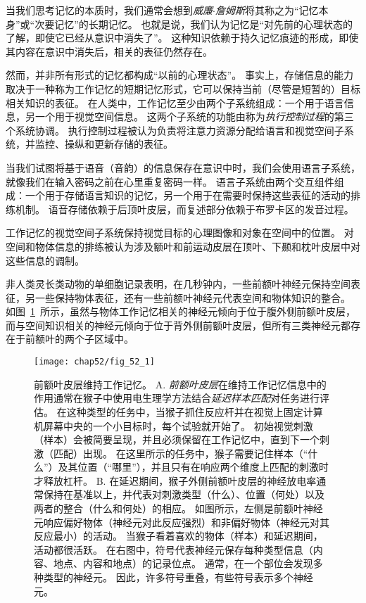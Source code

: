 当我们思考记忆的本质时，我们通常会想到\textit{威廉$\cdot$詹姆斯}将其称之为“记忆本身”或“次要记忆”的长期记忆。
也就是说，我们认为记忆是“对先前的心理状态的了解，即使它已经从意识中消失了”。
这种知识依赖于持久记忆痕迹的形成，即使其内容在意识中消失后，相关的表征仍然存在。


然而，并非所有形式的记忆都构成“以前的心理状态”。
事实上，存储信息的能力取决于一种称为工作记忆的短期记忆形式，它可以保持当前（尽管是短暂的）目标相关知识的表征。
在人类中，工作记忆至少由两个子系统组成：一个用于语言信息，另一个用于视觉空间信息。
这两个子系统的功能由称为\textit{执行控制过程}的第三个系统协调。
执行控制过程被认为负责将注意力资源分配给语言和视觉空间子系统，并监控、操纵和更新存储的表征。


当我们试图将基于语音（音韵）的信息保存在意识中时，我们会使用语言子系统，就像我们在输入密码之前在心里重复密码一样。
语言子系统由两个交互组件组成：一个用于存储语言知识的记忆，另一个用于在需要时保持这些表征的活动的排练机制。
语音存储依赖于后顶叶皮层，而复述部分依赖于布罗卡区的发音过程。


工作记忆的视觉空间子系统保持视觉目标的心理图像和对象在空间中的位置。
对空间和物体信息的排练被认为涉及额叶和前运动皮层在顶叶、下颞和枕叶皮层中对这些信息的调制。


非人类灵长类动物的单细胞记录表明，在几秒钟内，一些前额叶神经元保持空间表征，另一些保持物体表征，还有一些前额叶神经元代表空间和物体知识的整合。
如图~\ref{fig:52_1}~所示，虽然与物体工作记忆相关的神经元倾向于位于腹外侧前额叶皮层，而与空间知识相关的神经元倾向于位于背外侧前额叶皮层，但所有三类神经元都存在于前额叶的两个子区域中。


\begin{figure}[htbp]
	\centering
	\texttt{[image: chap52/fig\_52\_1]}
	\caption{前额叶皮层维持工作记忆\cite{rainer1998memory}。
		A. \textit{前额叶皮层}在维持工作记忆信息中的作用通常在猴子中使用电生理学方法结合\textit{延迟样本匹配}对任务进行评估。
		在这种类型的任务中，当猴子抓住反应杆并在视觉上固定计算机屏幕中央的一个小目标时，每个试验就开始了。
		初始视觉刺激（样本）会被简要呈现，并且必须保留在工作记忆中，直到下一个刺激（匹配）出现。
		在这里所示的任务中，猴子需要记住样本（“什么”）及其位置（“哪里”），并且只有在响应两个维度上匹配的刺激时才释放杠杆。
		B. 在延迟期间，猴子外侧前额叶皮层的神经放电率通常保持在基准以上，并代表对刺激类型（什么）、位置（何处）以及两者的整合（什么和何处）的相应。
		如图所示，左侧是前额叶神经元响应偏好物体（神经元对此反应强烈）和非偏好物体（神经元对其反应最小）的活动。
		当猴子看着喜欢的物体（样本）和延迟期间，活动都很活跃。
		在右图中，符号代表神经元保存每种类型信息（内容、地点、内容和地点）的记录位点。
		通常，在一个部位会发现多种类型的神经元。
		因此，许多符号重叠，有些符号表示多个神经元。}
	\label{fig:52_1}
\end{figure}


